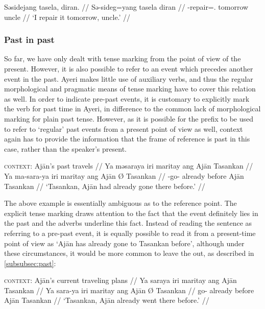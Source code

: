 \ex\begingl
	\gla Səsidejang tasela, diran. //
	\glb Sə-sideg=yang tasela diran //
	\glc \Fut{}-repair=\Fsg{}.\Aarg{} tomorrow uncle //
	\glft `I  repair it tomorrow, uncle.' //
\endgl\xe


\subsubsection{Past in past}

So far, we have only dealt with tense marking from the point of view of the 
present. However, it is also possible to refer to an event which precedes 
another event in the past. Ayeri makes little use of auxiliary verbs, and thus 
the regular morphological and pragmatic means of tense marking have to cover 
this relation as well. In order to indicate pre-past events, it is customary to 
explicitly mark the verb for past time in Ayeri, in difference to the 
common lack of morphological marking for plain past tense. However, as it is 
possible for the  prefix to be used to refer to `regular' past 
events from a present point of view as well, context again has to provide the 
information that the frame of reference is past in this case, rather than the 
speaker's present.

\ex
\begingl
	\glpreamble \textsc{context:} Ajān's past travels //
	\gla Ya məsaraya iri maritay ang Ajān {} Tasankan //
	\glb Ya ma-sara-ya iri maritay ang Ajān Ø Tasankan //
	\glc \LocT{} \Pst{}-go-\TsgM{} already before \Aarg{} Ajān \Top{} 
		Tasankan //
	\glft `Tasankan, Ajān had already gone there before.' //
\endgl
\xe

The above example is essentially ambiguous as to the reference point. The 
explicit tense marking draws attention to the fact that the event 
definitely lies in the past and the adverbs underline this fact. Instead of 
reading the sentence as referring to a pre-past event, it is equally possible to 
read it from a present-time point of view as `Ajān has already gone to Tasankan 
before', although under these circumstances, it would be more common to leave 
the  out, as described in \autoref{subsubsec:past}:

\ex
\begingl
	\glpreamble \textsc{context:} Ajān's current traveling plans //
	\gla Ya saraya iri maritay ang Ajān {} Tasankan //
	\glb Ya sara-ya iri maritay ang Ajān Ø Tasankan //
	\glc \LocT{} go-\TsgM{} already before \Aarg{} Ajān \Top{} 
		Tasankan //
	\glft `Tasankan, Ajān already went there before.' //
\endgl
\xe

